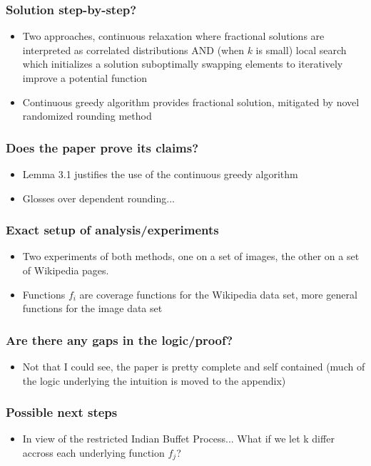 \documentclass{article}
\begin{document}
\subsubsection*{Solution step-by-step?}
\begin{itemize}
\item Two approaches, continuous relaxation where fractional solutions are interpreted as correlated distributions AND (when $k$ is small) local search which initializes a solution suboptimally swapping elements to iteratively improve a potential function
\item Continuous greedy algorithm provides fractional solution, mitigated by novel randomized rounding method
\end{itemize}

\subsubsection*{Does the paper prove its claims?}
\begin{itemize}
\item Lemma 3.1 justifies the use of the continuous greedy algorithm
\item Glosses over dependent rounding...
\end{itemize}

\subsubsection*{Exact setup of analysis/experiments}
\begin{itemize}
\item Two experiments of both methods, one on a set of images, the other on a set of Wikipedia pages.
\item Functions $f_i$ are coverage functions for the Wikipedia data set, more general functions for the image data set
\end{itemize}

\subsubsection*{Are there any gaps in the logic/proof?}
\begin{itemize}
\item Not that I could see, the paper is pretty complete and self contained (much of the logic underlying the intuition is moved to the appendix)
\end{itemize}

\subsubsection*{Possible next steps}
\begin{itemize}
\item In view of the restricted Indian Buffet Process... What if we let k differ accross each underlying function $f_j$?
\end{itemize}
\end{document}
